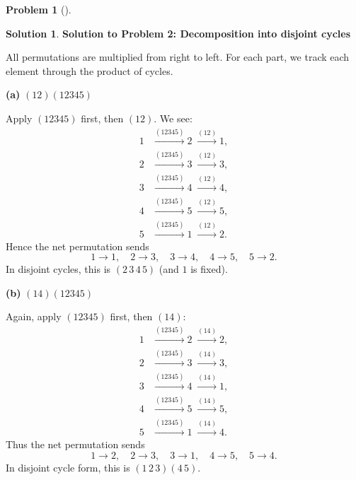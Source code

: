 \documentclass[12pt]{article}
\theoremstyle{definition} %
\newtheorem{solution}{Solution}
\newtheorem{problem}{Problem}
\theoremstyle{plain} %
\begin{document}
\begin{problem}[]
    
\end{problem}
\begin{solution}
    \textbf{Solution to Problem 2: Decomposition into disjoint cycles}

    \bigskip
    
    All permutations are multiplied from right to left. For each part, we track each element 
    through the product of cycles.
    
    \bigskip
    
    \noindent
    \textbf{(a) }$(12)(12345)$
    
    \medskip
    
    \noindent
    Apply $(12345)$ first, then $(12)$.  We see:
    \[
    \begin{aligned}
    1 &\xrightarrow{(12345)} 2 \;\xrightarrow{(12)} 1,\\
    2 &\xrightarrow{(12345)} 3 \;\xrightarrow{(12)} 3,\\
    3 &\xrightarrow{(12345)} 4 \;\xrightarrow{(12)} 4,\\
    4 &\xrightarrow{(12345)} 5 \;\xrightarrow{(12)} 5,\\
    5 &\xrightarrow{(12345)} 1 \;\xrightarrow{(12)} 2.
    \end{aligned}
    \]
    Hence the net permutation sends
    \[
    1 \to 1,\quad 2 \to 3,\quad 3 \to 4,\quad 4 \to 5,\quad 5 \to 2.
    \]
    In disjoint cycles, this is $(2\,3\,4\,5)$ (and $1$ is fixed).  
    
    \bigskip
    
    \noindent
    \textbf{(b) }$(14)(12345)$
    
    \medskip
    
    \noindent
    Again, apply $(12345)$ first, then $(14)$:
    \[
    \begin{aligned}
    1 &\xrightarrow{(12345)} 2 \;\xrightarrow{(14)} 2,\\
    2 &\xrightarrow{(12345)} 3 \;\xrightarrow{(14)} 3,\\
    3 &\xrightarrow{(12345)} 4 \;\xrightarrow{(14)} 1,\\
    4 &\xrightarrow{(12345)} 5 \;\xrightarrow{(14)} 5,\\
    5 &\xrightarrow{(12345)} 1 \;\xrightarrow{(14)} 4.
    \end{aligned}
    \]
    Thus the net permutation sends
    \[
    1 \to 2,\quad 2 \to 3,\quad 3 \to 1,\quad 4 \to 5,\quad 5 \to 4.
    \]
    In disjoint cycle form, this is $(1\,2\,3)(4\,5)$.
    

\end{solution}
\end{document}
